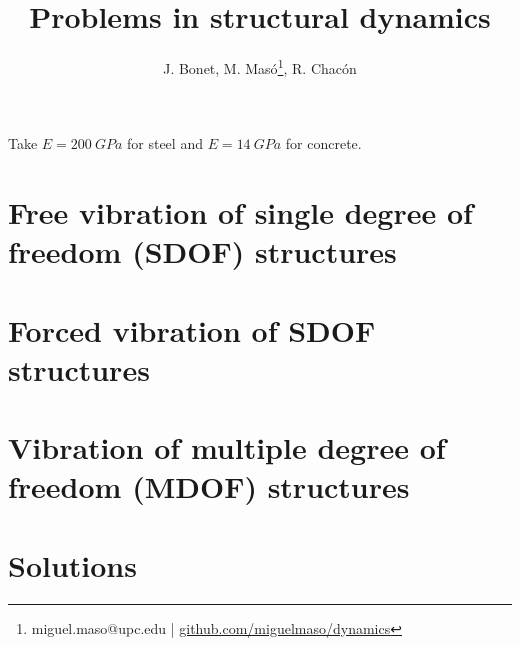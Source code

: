 \documentclass{problems}
\title[Structural dynamics]{Problems in structural dynamics}
\author{J. Bonet, M. Masó\footnote{miguel.maso@upc.edu | \href{https://github.com/miguelmaso/dynamics}{github.com/miguelmaso/dynamics}}, R. Chacón}
\begin{document}
\maketitle

Take $E=\SI{200}{GPa}$ for steel and $E=\SI{14}{GPa}$ for concrete.

\section{Free vibration of single degree of freedom (SDOF) structures}





\section{Forced vibration of SDOF structures}






% 
% 
% 
% 

\section{Vibration of multiple degree of freedom (MDOF) structures}



% 
% 

\newpage
\section{Solutions}
\shipoutAnswer

{}
\printbibliography
\end{document}
